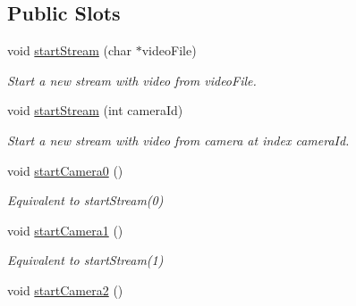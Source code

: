 \subsection*{Public Slots}
\begin{DoxyCompactItemize}
\item 
void \hyperlink{classLiveFitWindow_a91cf0faba83337bcf5588168440cdba4}{start\+Stream} (char $\ast$video\+File)\hypertarget{classLiveFitWindow_a91cf0faba83337bcf5588168440cdba4}{}\label{classLiveFitWindow_a91cf0faba83337bcf5588168440cdba4}

\begin{DoxyCompactList}\small\item\em Start a new stream with video from video\+File. \end{DoxyCompactList}\item 
void \hyperlink{classLiveFitWindow_a0b62438bf68461f6c2a5ae4a865482e5}{start\+Stream} (int camera\+Id)\hypertarget{classLiveFitWindow_a0b62438bf68461f6c2a5ae4a865482e5}{}\label{classLiveFitWindow_a0b62438bf68461f6c2a5ae4a865482e5}

\begin{DoxyCompactList}\small\item\em Start a new stream with video from camera at index camera\+Id. \end{DoxyCompactList}\item 
void \hyperlink{classLiveFitWindow_ad8adc384ed554f76dd29744a46c9a13c}{start\+Camera0} ()\hypertarget{classLiveFitWindow_ad8adc384ed554f76dd29744a46c9a13c}{}\label{classLiveFitWindow_ad8adc384ed554f76dd29744a46c9a13c}

\begin{DoxyCompactList}\small\item\em Equivalent to start\+Stream(0) \end{DoxyCompactList}\item 
void \hyperlink{classLiveFitWindow_af9e4798aa00fa1ffc3f0e23e41a3ca1d}{start\+Camera1} ()\hypertarget{classLiveFitWindow_af9e4798aa00fa1ffc3f0e23e41a3ca1d}{}\label{classLiveFitWindow_af9e4798aa00fa1ffc3f0e23e41a3ca1d}

\begin{DoxyCompactList}\small\item\em Equivalent to start\+Stream(1) \end{DoxyCompactList}\item 
void \hyperlink{classLiveFitWindow_a744f37125cf952f6720a6a41eca4dcf1}{start\+Camera2} ()\hypertarget{classLiveFitWindow_a744f37125cf952f6720a6a41eca4dcf1}{}\label{classLiveFitWindow_a744f37125cf952f6720a6a41eca4dcf1}


\end{DoxyCompactItemize}
